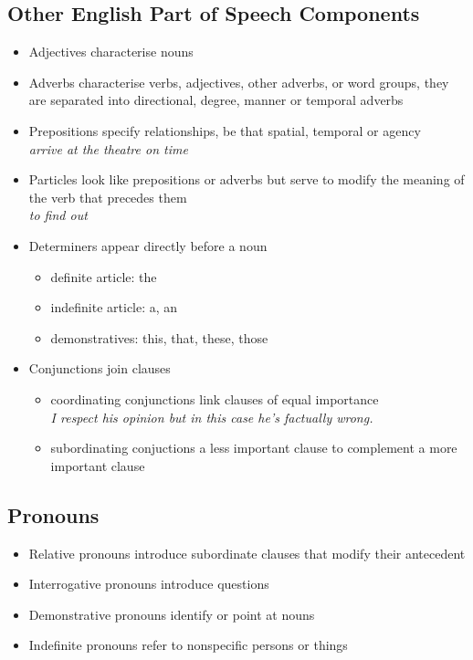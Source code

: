 \documentclass[11pt]{article}
\begin{document}
\subsection{Other English Part of Speech Components}
\begin{itemize}
	\item Adjectives characterise nouns
	\item Adverbs characterise verbs, adjectives, other adverbs, or word groups, they are separated into directional, degree, manner or temporal adverbs
	\item Prepositions specify relationships, be that spatial, temporal or agency\\
	\emph{arrive at the theatre on time}
	\item Particles look like prepositions or adverbs but serve to modify the meaning of the verb that precedes them\\
	\emph{to find out}
	\item Determiners appear directly before a noun
	\begin{itemize}
		\item definite article: the
		\item indefinite article: a, an
		\item demonstratives: this, that, these, those
	\end{itemize}
	\item Conjunctions join clauses
	\begin{itemize}
		\item coordinating conjunctions link clauses of equal importance\\
		\emph{I respect his opinion but in this case he's factually wrong.}
		\item subordinating conjuctions a less important clause to complement a more important clause
	\end{itemize}
\end{itemize}

\subsection{Pronouns}
\begin{itemize}
	\item Relative pronouns introduce subordinate clauses that modify their antecedent
	\item Interrogative pronouns introduce questions
	\item Demonstrative pronouns identify or point at nouns
	\item Indefinite pronouns refer to nonspecific persons or things
\end{itemize}
\end{document}
